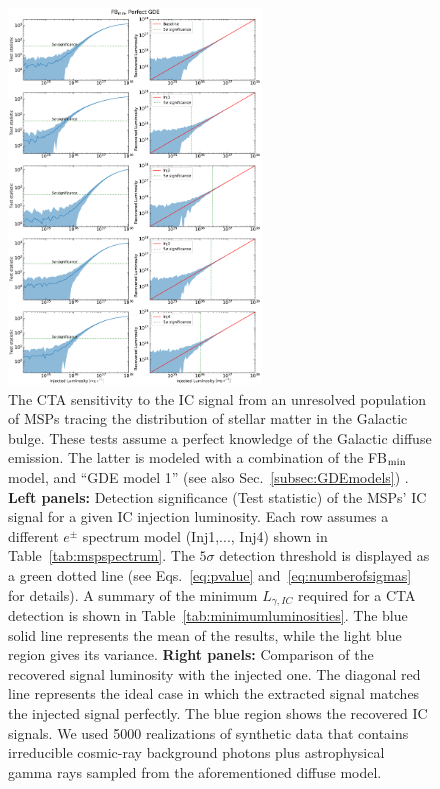 \documentclass[doublespace,nopageskip]{VTthesis} %
\begin{document}
\begin{figure}
    \centering
    \includegraphics[width=0.6\textwidth]{Figures/CTA/all-TS-mis-False-Fermi-min-True.pdf}
    \caption{The CTA sensitivity to the IC signal from an unresolved population of MSPs tracing the distribution of stellar matter in the Galactic bulge. These tests assume a perfect knowledge of the Galactic diffuse emission. The latter is modeled with a combination of the FB$_{\rm min}$ model, and ``GDE model 1'' (see also Sec.~\ref{subsec:GDEmodels})  
    . \textbf{Left panels:} Detection significance (Test statistic) of the MSPs' IC signal for a given IC injection luminosity. Each row assumes a different $e^\pm$ spectrum model (Inj1,..., Inj4) shown in Table~\ref{tab:mspspectrum}. The $5\sigma$ detection threshold is displayed as a green dotted line (see Eqs.~\ref{eq:pvalue} and~\ref{eq:numberofsigmas} for details). A summary of the minimum $L_{\gamma,IC}$ required for a CTA detection is shown in Table~\ref{tab:minimumluminosities}.  The blue solid line represents the mean of the results, while the light blue region gives its variance. \textbf{Right panels:} Comparison of the recovered signal luminosity with the injected one. The diagonal red line represents the ideal case in which the extracted signal matches the injected signal perfectly. The blue region shows the recovered IC signals. We used  5000 realizations of synthetic data that contains irreducible cosmic-ray background photons plus astrophysical gamma rays sampled from the aforementioned diffuse model. 
    }
    \label{fig:Injection_perfectGDE}
\end{figure}
\end{document}
